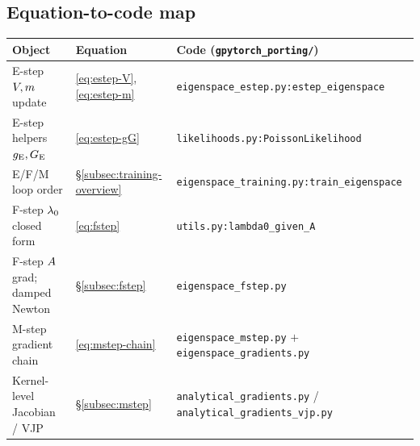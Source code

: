 \subsection*{Equation-to-code map}
\begin{center}\small
\begin{tabular}{@{}l l >{\raggedright\arraybackslash}p{2.7in}@{}}
\toprule
Object & Equation & Code (\texttt{gpytorch\_porting/}) \\
\midrule
E-step $V,m$ update & \eqref{eq:estep-V}, \eqref{eq:estep-m} & \texttt{eigenspace\_estep.py:}\allowbreak\texttt{estep\_eigenspace} \\
E-step helpers $g_{\mathrm{E}},G_{\mathrm{E}}$ & \eqref{eq:estep-gG} & \texttt{likelihoods.py:}\allowbreak\texttt{PoissonLikelihood} \\
E/F/M loop order & \S\ref{subsec:training-overview} & \texttt{eigenspace\_training.py:}\allowbreak\texttt{train\_eigenspace} \\
F-step $\lambda_{0}$ closed form & \eqref{eq:fstep} & \texttt{utils.py:lambda0\_given\_A} \\
F-step $A$ grad; damped Newton & \S\ref{subsec:fstep} & \texttt{eigenspace\_fstep.py} \\
M-step gradient chain & \eqref{eq:mstep-chain} & \texttt{eigenspace\_mstep.py} $+$\allowbreak{} \texttt{eigenspace\_gradients.py} \\
Kernel-level Jacobian / VJP & \S\ref{subsec:mstep} & \texttt{analytical\_gradients.py} /\allowbreak{} \texttt{analytical\_gradients\_vjp.py} \\
\bottomrule
\end{tabular}
\end{center}

\emergencystretch=0pt %
